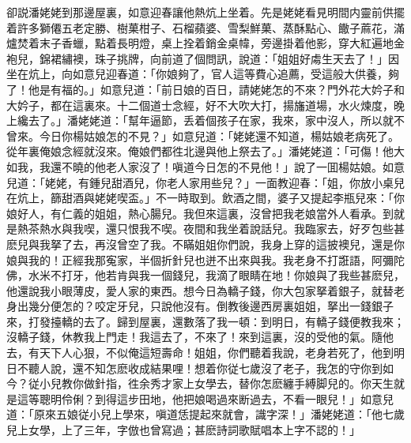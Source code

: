 卻説潘姥姥到那邊屋裏，如意迎春讓他熱炕上坐着。先是姥姥看見明間内靈前供擺着許多獅僊五老定勝、樹菓柑子、石榴蘋婆、雪梨鮮菓、蒸酥點心、饊子蔴花，滿爐焚着末子香蠟，點着長明燈，桌上拴着銷金桌幃，旁邊掛着他影，穿大紅遍地金袍兒，錦裙繡襖，珠子挑牌，向前道了個問訊，說道：「姐姐好䖏生天去了！」因坐在炕上，向如意兒迎春道：「你娘夠了，官人這等費心追薦，受這般大供養，夠了！他是有福的。」如意兒道：「前日娘的百日，請姥姥怎的不來？門外花大妗子和大妗子，都在這裏來。十二個道士念經，好不大吹大打，揚旛道場，水火煉度，晚上纔去了。」潘姥姥道：「幫年逼節，丢着個孩子在家，我來，家中沒人，所以就不曾來。今日你楊姑娘怎的不見？」如意兒道：「姥姥還不知道，楊姑娘老病死了。從年裏俺娘念經就沒來。俺娘們都徃北邊與他上祭去了。」潘姥姥道：「可傷！他大如我，我還不曉的他老人家沒了！嗔道今日怎的不見他！」說了一囬楊姑娘。如意兒道：「姥姥，有鍾兒甜酒兒，你老人家用些兒？」一面教迎春：「姐，你放小桌兒在炕上，篩甜酒與姥姥喫盃。」不一時取到。飲酒之間，婆子又提起李瓶兒來：「你娘好人，有仁義的姐姐，熱心腸兒。我但來這裏，沒曾把我老娘當外人看承。到就是熱茶熱水與我喫，還只恨我不喫。夜間和我坐着說話兒。我臨家去，好歹包些甚麽兒與我拏了去，再沒曾空了我。不瞞姐姐你們說，我身上穿的這披襖兒，還是你娘與我的！正經我那寃家，半個折針兒也迸不出來與我。我老身不打誑語，阿彌陀佛，水米不打牙，他若肯與我一個錢兒，我滴了眼睛在地！你娘與了我些甚麽兒，他還說我小眼薄皮，愛人家的東西。想今日為轎子錢，你大包家拏着銀子，就替老身出幾分便怎的？咬定牙兒，只說他沒有。倒教後邊西房裏姐姐，拏出一錢銀子來，打發擡轎的去了。歸到屋裏，還數落了我一頓：到明日，有轎子錢便教我來；沒轎子錢，休教我上門走！我這去了，不來了！來到這裏，沒的受他的氣。隨他去，有天下人心狠，不似俺這短壽命！姐姐，你們聽着我說，老身若死了，他到明日不聽人說，還不知怎麽收成結果哩！想着你従七歲沒了老子，我怎的守你到如今？従小兒教你做針指，徃余秀才家上女學去，替你怎麽纏手縛脚兒的。你天生就是這等聰明伶俐？到得這步田地，他把娘喝過來断過去，不看一眼兒！」如意兒道：「原來五娘従小兒上學來，嗔道恁提起來就會，識字深！」潘姥姥道：「他七歲兒上女學，上了三年，字倣也曾寫過；甚麽詩詞歌賦唱本上字不認的！」

